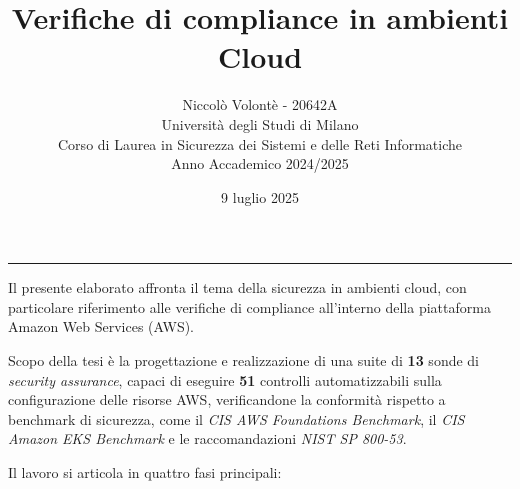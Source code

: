 \documentclass[11pt,a4paper]{article}
\title{\bfseries Verifiche di compliance in ambienti Cloud}
\author{Niccolò Volontè - 20642A\\
\normalsize Università degli Studi di Milano\\
\normalsize Corso di Laurea in Sicurezza dei Sistemi e delle Reti Informatiche\\
\normalsize Anno Accademico 2024/2025}
\date{9 luglio 2025}
\begin{document}
\maketitle
\vspace{1em}
\hrule
\vspace{1em}
Il presente elaborato affronta il tema della sicurezza in ambienti cloud, con particolare riferimento alle verifiche di compliance all'interno della piattaforma Amazon Web Services (AWS). 

Scopo della tesi è la progettazione e realizzazione di una suite di \textbf{13} sonde di \emph{security assurance}, capaci di eseguire \textbf{51} controlli automatizzabili sulla configurazione delle risorse AWS, verificandone la conformità rispetto a benchmark di sicurezza, come il \emph{CIS AWS Foundations Benchmark}, il \emph{CIS Amazon EKS Benchmark} e le raccomandazioni \emph{NIST SP 800-53}.

Il lavoro si articola in quattro fasi principali:
\end{document}

